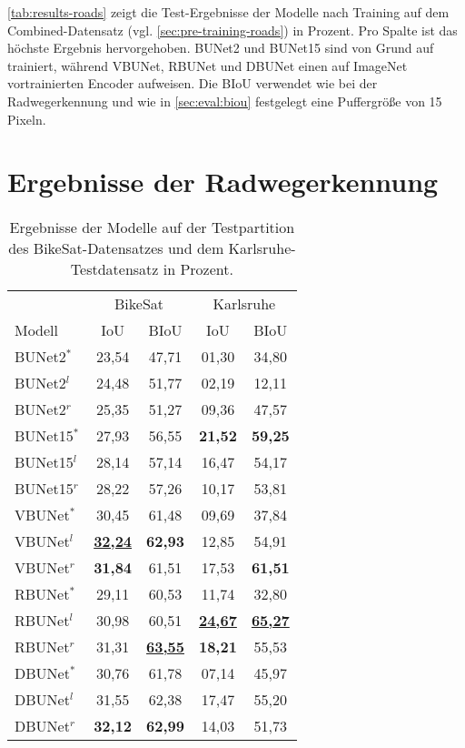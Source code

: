 \autoref{tab:results-roads} zeigt die Test-Ergebnisse der Modelle nach Training auf dem Combined-Datensatz 
(vgl. \autoref{sec:pre-training-roads}) in Prozent. Pro Spalte ist das höchste Ergebnis hervorgehoben. 
\ac{BUNet2} und \ac{BUNet15} sind von Grund auf trainiert, während \ac{VBUNet}, \ac{RBUNet} und \ac{DBUNet} einen auf 
ImageNet vortrainierten Encoder aufweisen. Die \ac{BIoU} verwendet wie bei der Radwegerkennung und wie in \autoref{sec:eval:biou} 
festgelegt eine Puffergröße von 15 Pixeln. 

\section{Ergebnisse der Radwegerkennung}

\begin{table}[ht]
	\centering
	\begin{tabular}{l|cc|cc}
        & \multicolumn{2}{c|}{BikeSat} & \multicolumn{2}{c}{Karlsruhe} \\
		Modell & \ac{IoU} & \ac{BIoU} & \ac{IoU} & \ac{BIoU} \\
		\midrule
        BUNet2$^*$ & 23,54 & 47,71 & 01,30 & 34,80 \\ 
        BUNet2$^l$ & 24,48 & 51,77 & 02,19 & 12,11 \\ 
        BUNet2$^r$ & 25,35 & 51,27 & 09,36 & 47,57 \\ 
		\midrule

        BUNet15$^*$ & 27,93 & 56,55 & \textbf{21,52} & \textbf{59,25} \\ 
        BUNet15$^l$ & 28,14 & 57,14 & 16,47 & 54,17 \\ 
        BUNet15$^r$ & 28,22 & 57,26 & 10,17 & 53,81 \\ 
		\midrule

        VBUNet$^*$ & 30,45 & 61,48 & 09,69 & 37,84 \\ 
        VBUNet$^l$ & \underline{\textbf{32,24}} & \textbf{62,93} & 12,85 & 54,91 \\ 
        VBUNet$^r$ & \textbf{31,84} & 61,51 & 17,53 & \textbf{61,51} \\ 
		\midrule

        RBUNet$^*$ & 29,11 & 60,53 & 11,74 & 32,80 \\ 
        RBUNet$^l$ & 30,98 & 60,51 & \underline{\textbf{24,67}} & \underline{\textbf{65,27}} \\ 
        RBUNet$^r$ & 31,31 & \underline{\textbf{63,55}} & \textbf{18,21} & 55,53 \\ 
		\midrule

        DBUNet$^*$ & 30,76 & 61,78 & 07,14 & 45,97 \\ 
        DBUNet$^l$ & 31,55 & 62,38 & 17,47 & 55,20 \\ 
        DBUNet$^r$ & \textbf{32,12} & \textbf{62,99} & 14,03 & 51,73 \\ 
        
	\end{tabular}
	\caption{Ergebnisse der Modelle auf der Testpartition des BikeSat-Datensatzes und dem Karlsruhe-Testdatensatz 
    in Prozent.}
	\label{tab:results}
\end{table}

